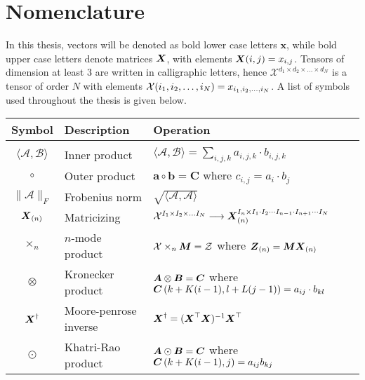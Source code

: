 \section{Nomenclature}

In this thesis, vectors will be denoted as bold lower case letters $\boldsymbol{x}$, while bold upper case letters denote matrices $\boldsymbol{X}$, with elements $\boldsymbol{X}(i, j) = x_{i,j}$. Tensors of dimension at least 3 are written in calligraphic letters, hence $\mathcal{X}^{d_1\times d_2 \times \dots \times d_N}$ is a tensor of order $N$ with elements $\mathcal{X}(i_1, i_2, \dots, i_N) = x_{i_1, i_2, \dots, i_N}$. A list of symbols used throughout the thesis is given below. 

\vspace{1cm}

\begin{tabular}{cll}
    \textbf{Symbol} & \textbf{Description} & \textbf{Operation}  \\ \hline
    & & \\
    $\langle \mathcal{A}, \mathcal{B}\rangle$ & Inner product & $\langle \mathcal{A}, \mathcal{B}\rangle = \sum_{i,j,k} a_{i,j,k}\cdot b_{i,j,k}$ \\[2ex]
    $\circ$ &  Outer product & $\boldsymbol{a} \circ \boldsymbol{b} = \boldsymbol{C}$ where $c_{i,j} = a_i \cdot b_j$ \\[2ex]
    $\| \mathcal{A} \|_F$ & Frobenius norm & $\sqrt{\langle \mathcal{A}, \mathcal{A}\rangle}$ \\[2ex]
    $\boldsymbol{X}_{(n)}$ & Matricizing & $\mathcal{X}^{I_1 \times I_2 \times \dots I_N} \longrightarrow \boldsymbol{X}_{(n)}^{I_n \times I_1 \cdot I_2 \cdots I_{n-1} \cdot I_{n+1} \cdots I_N}$ \\[2ex]
    $\times_n$ & $n$-mode product & $\mathcal{X}\times_n \boldsymbol{M} = \mathcal{Z}$ where $\boldsymbol{Z}_{(n)} = \boldsymbol{M}\boldsymbol{X}_{(n)}$ \\[2ex]
    $\otimes$ & Kronecker product & $\boldsymbol{A}\otimes \boldsymbol{B} = \boldsymbol{C}$ where $\boldsymbol{C}\left(k + K(i-1), l + L(j-1)\right) = a_{ij} \cdot b_{kl}$ \\[2ex]
    $\boldsymbol{X}^{\dagger}$ & Moore-penrose inverse & $\boldsymbol{X}^{\dagger} = ( \boldsymbol{X}^\top \boldsymbol{X})^{-1}\boldsymbol{X}^{\top}$ \\[2ex]
    $\odot$ & Khatri-Rao product & $\boldsymbol{A} \odot \boldsymbol{B} = \boldsymbol{C}$ where $\boldsymbol{C}\left(k + K(i-1), j\right) = a_{ij}b_{kj}$
\end{tabular}